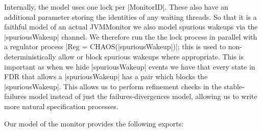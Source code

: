 
Internally, the model uses one lock per |MonitorID|. These also have an additional parameter storing the identities of any waiting threads. So that it is a faithful model of an actual JVMMonitor we also model spurious wakeups via the |spuriousWakeup| channel. We therefore run the the lock process in parallel with a regulator process |Reg = CHAOS({|spuriousWakeup|})|; this is used to non-deterministically allow or block spurious wakeups where appropriate. This is important as when we hide |spuriousWakeup| events we have that every state in FDR that allows a |spuriousWakeup| has a pair which blocks the |spuriousWakeup|. This allows us to perform refinement checks in the stable-failures model instead of just the failures-divergences model, allowing us to write more natural specification processes.

Our model of the monitor provides the following exports:

